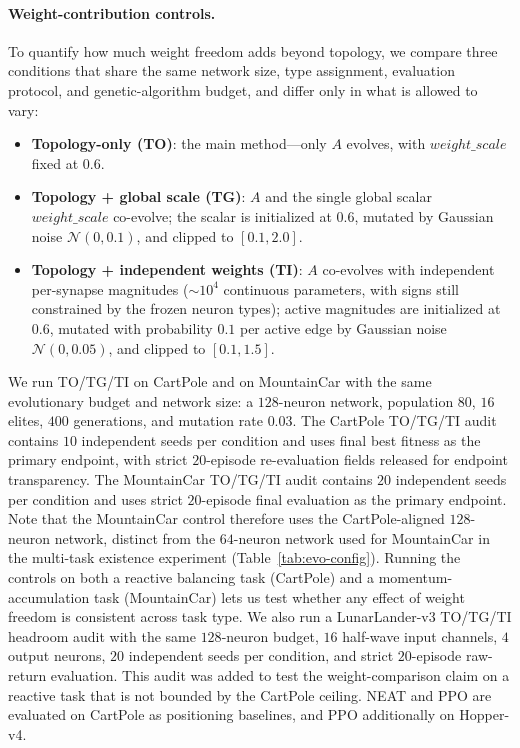 \documentclass[10pt]{article}
\begin{document}
\paragraph{Weight-contribution controls.} To quantify how much weight freedom
adds beyond topology, we compare three conditions that share the same network
size, type assignment, evaluation protocol, and genetic-algorithm budget, and
differ only in what is allowed to vary:
\begin{itemize}
\item \textbf{Topology-only (TO)}: the main method---only $A$ evolves, with
$\mathit{weight\_scale}$ fixed at $0.6$.
\item \textbf{Topology + global scale (TG)}: $A$ and the single global scalar
$\mathit{weight\_scale}$ co-evolve; the scalar is initialized at $0.6$, mutated
by Gaussian noise $\mathcal{N}(0,0.1)$, and clipped to $[0.1,2.0]$.
\item \textbf{Topology + independent weights (TI)}: $A$ co-evolves with
independent per-synapse magnitudes (${\sim}10^4$ continuous parameters, with
signs still constrained by the frozen neuron types); active magnitudes are
initialized at $0.6$, mutated with probability $0.1$ per active edge by Gaussian
noise $\mathcal{N}(0,0.05)$, and clipped to $[0.1,1.5]$.
\end{itemize}
We run TO/TG/TI on CartPole and on MountainCar with the same evolutionary budget
and network size: a $128$-neuron network, population $80$, $16$ elites, $400$
generations, and mutation rate $0.03$. The CartPole TO/TG/TI audit contains $10$
independent seeds per condition and uses final best fitness as the primary
endpoint, with strict $20$-episode re-evaluation fields released for endpoint
transparency. The MountainCar TO/TG/TI audit contains $20$ independent seeds per
condition and uses strict $20$-episode final evaluation as the primary endpoint.
Note that the MountainCar control therefore uses the CartPole-aligned
$128$-neuron network, distinct from the $64$-neuron network used for MountainCar
in the multi-task existence experiment (Table~\ref{tab:evo-config}). Running the
controls on both a reactive balancing task (CartPole) and a momentum-accumulation
task (MountainCar) lets us test whether any effect of weight freedom is
consistent across task type. We also run a LunarLander-v3 TO/TG/TI headroom audit
with the same $128$-neuron budget, $16$ half-wave input channels, $4$ output
neurons, $20$ independent seeds per condition, and strict $20$-episode raw-return
evaluation. This audit was added to test the weight-comparison claim on a
reactive task that is not bounded by the CartPole ceiling. NEAT and PPO are evaluated on CartPole as
positioning baselines, and PPO additionally on Hopper-v4.
\end{document}
